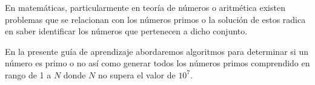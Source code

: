 En matemáticas, particularmente en teoría de números o aritmética existen problemas que se relacionan con los números primos o la solución de estos radica en saber identificar los números que pertenecen a dicho  conjunto. 

En la presente guía de aprendizaje abordaremos algoritmos para determinar si un número es primo o no así como generar todos los números primos comprendido en rango de 1 a $N$ donde $N$ no supera el valor de $10^{7}$.
